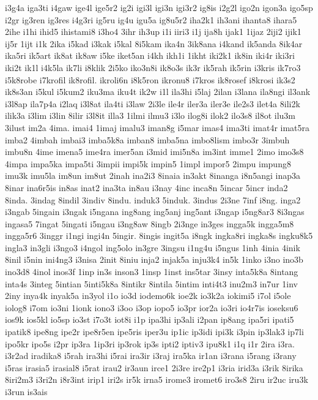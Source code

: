 {i3g4a iga3ti i4gaw ige4l ige5r2 ig2i igi3l igi3n igi3r2 ig8is i2g2l igo2n
igon3a igo5sp i2gr ig3ren ig3res i4g3ri ig5ru ig4u igu5a ig8u5r2 iha2k1
ih3ani ihanta8 ihara5 2ihe i1hi ihid5 ihistami8 i3ho4 3ihr ih3up i1i iiri3
i1j ija8h ijak1 1ijaz 2iji2 ijik1 ij5r 1ijt i1k 2ika i5kad i3kak i5kal
8i5kam ika4n 3ik8ana i4kand ik5anda 8ik4ar ika5ri ik5art ik8at ik8aw i5ke
iket5an i4kh ikh1i 1ikht iki2k1 ik8in iki4r iki3ri iki2t ik1l i4k5la ik7li
i8klik 2i5ko iko3n8i ik8o3s ik3r ik5rah ik5rin i3kris ik7ro3 i5k8robe
i7krofil ik8rofil. ikroli6n i8k5ron ikronu8 i7kros ik8rosef i8krosi ik3s2
ik8s3an i5kul i5kum2 iku3ma iku4t ik2w i1l ila3hi i5laj 2ilan i3lana
ila8ngi il3ank i3l8ap ila7p4a i2laq i3l8at ila4ti i3law 2i3le ile4r iler3a
iler3e ile2s3 ilet4a 8ili2k ilik3a i3lim i3lin 8ilir i3l8it illa3 1ilmi
ilmu3 i3lo ilog8i ilok2 ilo3s8 il8ot ilu3m 3ilust im2a 4ima. imai4 1imaj
imalu3 iman8g i5mar imas4 ima3ti imat4r imat5ra imba2 4imbah imbai3
imba5k8a imban8 imba5na imbo8lism imbo3r 3imbuh imbu8n 4ime imena5 ime4ra
imer5an i3mid imi5n8a im3int imme1 2imo imo3s8 4impa impa5ka impa5ti
3impii impi5k impin5 1impl impor5 2impu impung8 imu3k imu5la im8un im8ut
2inah ina2i3 8inaia in3akt 8inanga i8n5angi inap3a 8inar ina6r5is in8as
inat2 ina3ta in8au i3nay 4inc inca8n 5incar 5incr inda2 8inda. 3indag
8indil 3indiv 8indu. induk3 5induk. 3indus 2i3ne 7inf i8ng. inga2 i3ngab
5ingain i3ngak i5ngana ing8ang ing5anj ing5ant i3ngap i5ng8ar3 8i3ngas
ingasa5 7ingat 5ingati i5ngau i3ng8aw 8ingb 2i3nge in3ges ingga5k ingga5m8
ingga5r6 3inggr i1ngi ingi4n 5ingir. 8ingis ingit5a i8ngk ingka8ri ingka8s
ingku8k5 ingla3 in3gli i3ngo3 i4ngol ing5olo in3gre 3ingsu i1ng4u i5ngus
1inh 4inia 4inik 8inil i5nin ini4ng3 i3nisa 2init 8iniu inja2 injak5a
inju3k4 in5k 1inko i3no ino3b ino3d8 4inol inos3f 1inp in3s inson3 1insp
1inst ins5tar 3insy inta5k8a 8intang inta4s 3integ 5intian 5inti5k8a
8intikr 8intila 5intim inti4t3 inu2m3 in7ur 1inv 2iny inya4k inyak5a
in3yol i1o io3d iodemo6k ioe2k io3k2a iokimi5 i7ol i5ole iolog8 i7om io3ni
1ionk iono3 i3oo i3op iopo5 io3pr ior2a io3ri io4r7is ioseksu6 ios9k
ios5kl io5sp io3st i7o3t iot8i i1p ipa3hi ip3ali i2pan ip8ang ipa5ri
ipati5 ipatik8 ipe8ng ipe2r ipe8r5en ipe5ris iper3u ip1ic ip3idi ipi3k
i3pin ip3lak3 ip7li ipo5kr ipo5s i2pr ip3ra 1ip3ri ip3rok ip3s ipti2
iptiv3 ipu8k1 i1q i1r 2ira i3ra. i3r2ad iradika8 i5rah ira3hi i5rai ira3ir
i3raj ira5ka ir1an i3rana i5rang i3rany i5ras irasia5 irasial8 i5rat irau2
ir3aun irce1 2i3re ire2p1 i3ria irid3a i3rik 8irika 8iri2m3 i3ri2n i8r3int
irip1 iri2s ir5k irna5 irome3 iromet6 iro3s8 2iru ir2uc iru3k i3run is3ais
}

